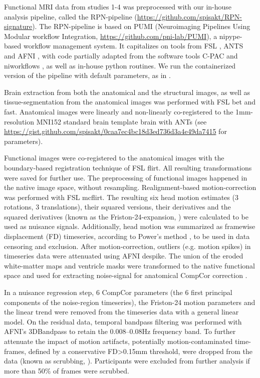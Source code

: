 \documentclass{article}
\begin{document}
Functional MRI data from studies 1-4 was preprocessed with our in-house analysis pipeline, called the RPN-pipeline (\href{https://github.com/spisakt/RPN-signature}{https://github.com/spisakt/RPN-signature}). The RPN-pipeline is based on PUMI (Neuroimaging Pipelines Using Modular workflow Integration, \href{https://github.com/pni-lab/PUMI}{https://github.com/pni-lab/PUMI}), a nipype-based \citep{gorgolewski2011nipype} workflow management system. It capitalizes on tools from FSL \citep{jenkinson2012fsl}, ANTS \citep{avants2011reproducible} and AFNI \citep{cox1996afni}, with code partially adapted from the software tools C-PAC \citep{craddock2013towards} and niworkflows \citep{esteban2019fmriprep}, as well as in-house python routines. We run the containerized version of the pipeline with default parameters, as in \cite{Spisak_2020}.

Brain extraction from both the anatomical and the structural images, as well as tissue-segmentation from the anatomical images was performed with FSL bet and fast. Anatomical images were linearly and non-linearly co-registered to the 1mm-resolution MNI152 standard brain template brain with ANTs (see \href{https://gist.github.com/spisakt/0caa7ec4bc18d3ed736d3a4e49da7415}{https://gist.github.com/spisakt/0caa7ec4bc18d3ed736d3a4e49da7415} for parameters).

Functional images were co-registered to the anatomical images with the boundary-based registration technique of FSL flirt. All resulting transformations were saved for further use. The preprocessing of functional images happened in the native image space, without resampling. Realignment-based motion-correction was performed with FSL mcflirt. The resulting six head motion estimates (3 rotations, 3 translations), their squared versions, their derivatives and the squared derivatives (known as the Friston-24-expansion, \cite{friston1996movement}) were calculated to be used as nuisance signals. Additionally, head motion was summarized as framewise displacement (FD) timeseries, according to Power's method \citep{power2012spurious}, to be used in data censoring and exclusion. After motion-correction, outliers (e.g. motion spikes) in timeseries data were attenuated using AFNI despike. The union of the eroded white-matter maps and ventricle masks were transformed to the native functional space and used for extracting noise-signal for anatomical CompCor correction \citep{behzadi2007component}.

In a nuisance regression step, 6 CompCor parameters (the 6 first principal components of the noise-region timeseries), the Friston-24 motion parameters and the linear trend were removed from the timeseries data with a general linear model. On the residual data, temporal bandpass filtering was performed with AFNI's 3DBandpass to retain the 0.008--0.08Hz frequency band. To further attenuate the impact of motion artifacts, potentially motion-contaminated time-frames, defined by a conservative FD\textgreater 0.15mm threshold, were dropped from the data (known as scrubbing, \cite{satterthwaite2013improved}). Participants were excluded from further analysis if more than 50\% of frames were scrubbed.
\end{document}
